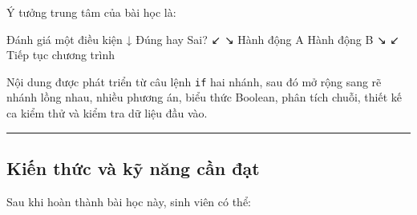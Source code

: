 \documentclass[
  11pt,
  a4paper,
]{article}
\newenvironment{Shaded}{}{}
\newcommand{\NormalTok}[1]{#1}
\begin{document}
Ý tưởng trung tâm của bài học là:

\begin{Shaded}
\begin{Highlighting}[]
\NormalTok{Đánh giá một điều kiện}
\NormalTok{          ↓}
\NormalTok{    Đúng hay Sai?}
\NormalTok{       ↙      ↘}
\NormalTok{  Hành động A  Hành động B}
\NormalTok{       ↘      ↙}
\NormalTok{  Tiếp tục chương trình}
\end{Highlighting}
\end{Shaded}

Nội dung được phát triển từ câu lệnh \texttt{if} hai nhánh, sau đó mở
rộng sang rẽ nhánh lồng nhau, nhiều phương án, biểu thức Boolean, phân
tích chuỗi, thiết kế ca kiểm thử và kiểm tra dữ liệu đầu vào.

\begin{center}\rule{0.5\linewidth}{0.5pt}\end{center}

\subsection{Kiến thức và kỹ năng cần
đạt}\label{kiux1ebfn-thux1ee9c-vuxe0-kux1ef9-nux103ng-cux1ea7n-ux111ux1ea1t}

Sau khi hoàn thành bài học này, sinh viên có thể:
\end{document}
